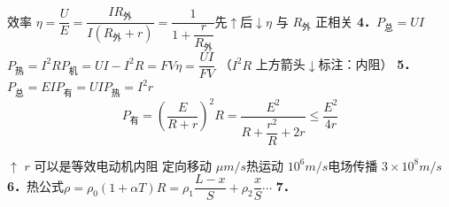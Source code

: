 效率 $\eta=\dfrac{U}{E}=\dfrac{IR_{\text{外}}}{I(R_{\text{外}}+r)}=\dfrac{1}{1+\dfrac{r}{R_{\text{外}}}}$\quad 先$\uparrow$后$\downarrow$\quad $\eta$ 与 $R_{\text{外}}$ 正相关 %
\textbf{4．}\quad $P_{\text{总}}=UI$\quad $P_{\text{热}}=I^2R$\quad $P_{\text{机}}=UI-I^2R=FV$\quad $\eta=\dfrac{UI}{FV}$ %
（$I^2R$ 上方箭头$\downarrow$标注：内阻）
\textbf{5．}\quad $P_{\text{总}}=EI$\quad $P_{\text{有}}=UI$\quad $P_{\text{热}}=I^2r$
\[P_{\text{有}}=\left(\frac{E}{R+r}\right)^2R=\frac{E^2}{R+\dfrac{r^2}{R}+2r}\le\frac{E^2}{4r}\]

$\uparrow$ %
$r$ 可以是等效电动机内阻
定向移动 $\mu\unit{m/s}$\quad 热运动 $10^6\unit{m/s}$\quad 电场传播 $3\times10^8\unit{m/s}$
\textbf{6．}热公式\quad $\rho=\rho_0(1+\alpha T)$\quad $R=\rho_1\dfrac{L-x}{S}+\rho_2\dfrac{x}{S}\cdots$
\textbf{7．} %
